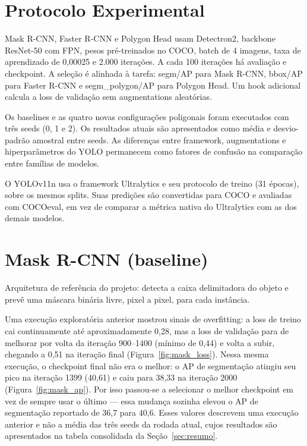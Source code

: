 \documentclass[11pt]{article}
\begin{document}
\section{Protocolo Experimental}

Mask R-CNN, Faster R-CNN e Polygon Head usam Detectron2, backbone ResNet-50 com FPN,
pesos pré-treinados no COCO, batch de 4 imagens, taxa de aprendizado de 0,00025 e
2.000 iterações. A cada 100 iterações há avaliação e checkpoint. A seleção é
alinhada à tarefa: segm/AP para Mask R-CNN, bbox/AP para Faster R-CNN e
segm\_polygon/AP para Polygon Head. Um hook adicional calcula a loss de validação
sem augmentations aleatórias.

Os baselines e as quatro novas configurações poligonais foram executados com três
seeds (0, 1 e 2). Os resultados atuais são apresentados como média e desvio-padrão
amostral entre seeds. As diferenças entre framework, augmentations e hiperparâmetros
do YOLO permanecem como fatores de confusão na comparação entre famílias de modelos.

O YOLOv11n usa o framework Ultralytics e seu protocolo de treino (31 épocas), sobre
os mesmos splits. Suas predições são convertidas para COCO e avaliadas com COCOeval,
em vez de comparar a métrica nativa do Ultralytics com as dos demais modelos.

\section{Mask R-CNN (baseline)}
\label{sec:maskrcnn}

Arquitetura de referência do projeto: detecta a caixa delimitadora do objeto e
prevê uma máscara binária livre, pixel a pixel, para cada instância.

Uma execução exploratória anterior mostrou sinais de overfitting: a loss de treino
cai continuamente até aproximadamente 0,28, mas a loss de validação para de melhorar
por volta da iteração 900--1400 (mínimo de 0,44) e volta a subir, chegando a 0,51 na
iteração final (Figura~\ref{fig:mask_loss}). Nessa mesma execução, o checkpoint
final não era o melhor: o AP de segmentação atingiu seu pico na iteração 1399
(40,61) e caiu para 38,33 na iteração 2000 (Figura~\ref{fig:mask_ap}). Por isso
passou-se a selecionar o melhor checkpoint em vez de sempre usar o último --- essa
mudança sozinha elevou o
AP de segmentação reportado de 36,7 para 40,6. Esses valores descrevem uma execução
anterior e não a média das três seeds da rodada atual, cujos resultados são
apresentados na tabela consolidada da Seção~\ref{sec:resumo}.
\end{document}
